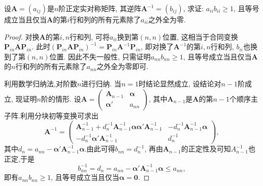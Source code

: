 \documentclass[../../main.tex]{subfiles}%
\begin{document}
\begin{example}
设$\boldsymbol{A}=(a_{ij})$是$n$阶正定实对称矩阵, 其逆阵$\boldsymbol{A}^{-1}=(b_{ij})$, 求证: $a_{ii}b_{ii}\geqslant  1$, 且等号成立当且仅当$\boldsymbol{A}$的第$i$行和列的所有元素除了$a_{ii}$之外全为零.
\end{example}
\begin{proof}
对换$\boldsymbol{A}$的第$i,n$行和列, 可将$a_{ii}$换到第$(n,n)$位置, 这相当于合同变换$\boldsymbol{P}_{in}\boldsymbol{A}\boldsymbol{P}_{in}$. 此时$(\boldsymbol{P}_{in}\boldsymbol{A}\boldsymbol{P}_{in})^{-1}=\boldsymbol{P}_{in}\boldsymbol{A}^{-1}\boldsymbol{P}_{in}$, 即对换了$\boldsymbol{A}^{-1}$的第$i,n$行和列, $b_{ii}$也换到了第$(n,n)$位置. 因此不失一般性, 只需证明$a_{nn}b_{nn}\geqslant  1$, 且等号成立当且仅当$\boldsymbol{A}$的$n$行和列的所有元素除了$a_{nn}$之外全为零即可. 

利用数学归纳法,对阶数$n$进行归纳. 当$n = 1$时结论显然成立, 设结论对$n - 1$阶成立, 现证明$n$阶的情形. 设$\boldsymbol{A}=\begin{pmatrix}
\boldsymbol{A}_{n - 1} & \boldsymbol{\alpha} \\
\boldsymbol{\alpha}' & a_{nn}
\end{pmatrix}$, 其中$\boldsymbol{A}_{n - 1}$是$\boldsymbol{A}$的第$n - 1$个顺序主子阵.利用分块初等变换可求出
\[
\boldsymbol{A}^{-1}=\begin{pmatrix}
\boldsymbol{A}_{n - 1}^{-1}+d_n^{-1}\boldsymbol{A}_{n - 1}^{-1}\boldsymbol{\alpha}\boldsymbol{\alpha}'\boldsymbol{A}_{n - 1}^{-1} & -d_n^{-1}\boldsymbol{A}_{n - 1}^{-1}\boldsymbol{\alpha} \\
-d_n^{-1}\boldsymbol{\alpha}'\boldsymbol{A}_{n - 1}^{-1} & d_n^{-1}
\end{pmatrix},
\]
其中$d_n = a_{nn}-\boldsymbol{\alpha}'\boldsymbol{A}_{n - 1}^{-1}\boldsymbol{\alpha}$.由此可得$b_{nn}=d_n^{-1}$, 再由$\boldsymbol{A}_{n - 1}$的正定性及可知$A_{n-1}^{-1}$也正定,于是
\[
b_{nn}^{-1}=d_n=a_{nn}-\boldsymbol{\alpha}'\boldsymbol{A}_{n - 1}^{-1}\boldsymbol{\alpha}\leqslant  a_{nn},
\]
即有$a_{nn}b_{nn}\geqslant  1$, 且等号成立当且仅当$\boldsymbol{\alpha}=\boldsymbol{0}$. 
\end{proof}
\end{document}
